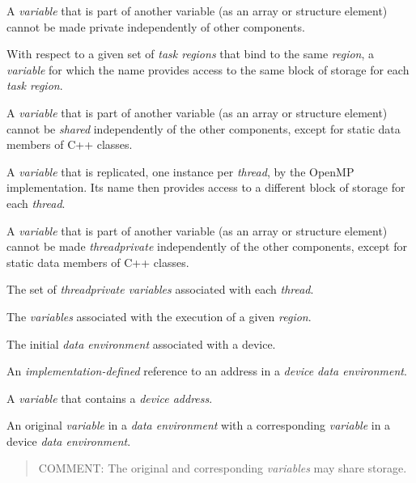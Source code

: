 A \emph{variable} that is part of another variable (as an array or 
structure element) cannot be made private independently of other components.
\glossarydefend

\glossarydefstart
With respect to a given set of \emph{task regions} that bind to the same 
 \emph{region}, a \emph{variable} for which the name 
provides access to the same block of storage for each \emph{task region}.

A \emph{variable} that is part of another variable (as an array or 
structure element) cannot be \emph{shared} independently of the other 
components, except for static data members of C++ classes.
\glossarydefend

\glossarydefstart
A \emph{variable} that is replicated, one instance per \emph{thread}, by the 
OpenMP implementation. Its name then provides access to a different block of 
storage for each \emph{thread}.

A \emph{variable} that is part of another variable (as an array or structure 
element) cannot be made \emph{threadprivate} independently of the other 
components, except for static data members of C++ classes.
\glossarydefend

\glossarydefstart
The set of \emph{threadprivate variables} associated with each \emph{thread}.
\glossarydefend

\glossarydefstart
The \emph{variables} associated with the execution of a given \emph{region}.
\glossarydefend

\glossarydefstart
The initial \emph{data environment} associated with a device.
\glossarydefend
\bigskip

\glossarydefstart
An \emph{implementation-defined} reference to an address in a 
\emph{device data environment}.
\glossarydefend

\glossarydefstart
A \emph{variable} that contains a \emph{device address}.
\glossarydefend


\glossarydefstart
An original \emph{variable} in a \emph{data environment} with a corresponding 
\emph{variable} in a device \emph{data environment}.

\begin{quote}
COMMENT: The original and corresponding \emph{variables} may share storage.
\end{quote}
\glossarydefend

